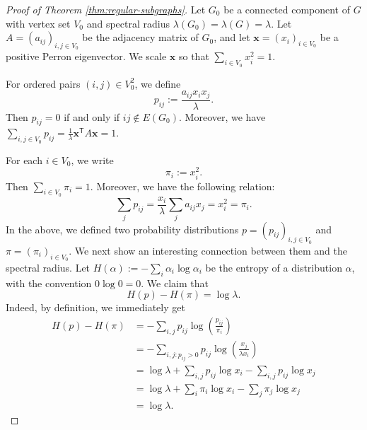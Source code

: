 \documentclass[10pt,a4paper]{amsart}
\begin{document}
\begin{proof}[Proof of Theorem \ref{thm:regular-subgraphs}]
Let \(G_0\) be a connected component of \(G\) with vertex set \(V_0\)
and spectral radius \(\lambda(G_0)=\lambda (G)=\lambda \).  Let
\(A=(a_{ij})_{i,j\in V_0}\) be the adjacency matrix of \(G_0\), and let
\(\bm x=(x_i)_{i\in V_0}\) be a positive Perron eigenvector.  We scale
\(\bm x\) so that $\sum_{i\in V_0}x_i^2=1$. 

For ordered pairs \((i,j)\in V_0^2\), we define
\[
        p_{ij}:=\frac{a_{ij}x_i x_j}{\lambda}.
\]
Then \(p_{ij}=0\) if and only if \(ij\notin E(G_0)\).  Moreover, we have $ \sum_{i,j\in V_0}p_{ij}
        =
        \frac{1}{\lambda} \bm x^{\mathsf T}A\bm x
        =
        1$. 
        
For each \(i\in V_0\), we write 
\[ \pi_i:=x_i^2. \] 
Then $\sum_{i\in V_0} \pi_i =1$. Moreover, we have the following relation:  
\begin{equation} \label{eq:sum_j}
        \sum_j p_{ij}
        =
        \frac{x_i}{\lambda}\sum_j a_{ij}x_j
        =
        x_i^2 =\pi_i.
\end{equation}
In the above, we defined two probability distributions $p=(p_{ij})_{i,j\in V_0}$ and $\pi=(\pi_i)_{i\in V_0}$. 
We next show an interesting connection between them and the  spectral radius.
Let
$ H(\alpha):=-\sum_i \alpha_i\log\alpha_i$ 
be the entropy of a distribution $\alpha$, with the convention \(0\log0=0\). 
 We claim that 
\begin{equation} \label{eq-connection}
        H(p)-H(\pi)=\log\lambda .
\end{equation}
Indeed, by definition, we immediately get 
\[
\begin{aligned}
        H(p)-H(\pi)
        &=
        -\sum_{i,j}p_{ij}
        \log\left(\frac{p_{ij}}{\pi_i}\right)                              \\
        &=
        -\sum_{i,j:p_{ij}>0}p_{ij}
        \log\left(\frac{x_j}{\lambda x_i}\right)                            \\
        &=
        \log\lambda
        +
        \sum_{i,j}p_{ij}\log x_i
        -
        \sum_{i,j}p_{ij}\log x_j                                            \\
        &=
        \log\lambda
        +
        \sum_i \pi_i\log x_i
        -
        \sum_j \pi_j\log x_j                                                \\
        &=
        \log\lambda .
\end{aligned}
\]


\end{proof}
\end{document}

